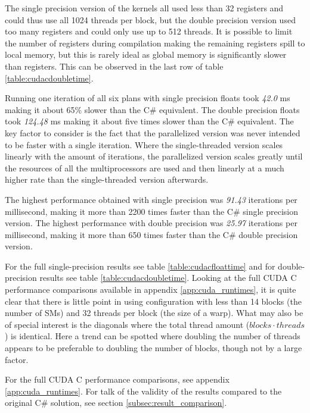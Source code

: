 The single precision version of the kernels all used less than 32 registers and could thus use all 1024 threads per block, but the double precision version used too many registers and could only use up to 512 threads. 
It is possible to limit the number of registers during compilation making the remaining registers spill to local memory, but this is rarely ideal as global memory is significantly slower than registers.
This can be observed in the last row of table \ref{table:cudacdoubletime}.

Running one iteration of all six plans with single precision floats took \emph{42.0} ms making it about 65\% slower than the C\# equivalent.
The double precision floats took \emph{124.48} ms making it about five times slower than the C\# equivalent.
The key factor to consider is the fact that the parallelized version was never intended to be faster with a single iteration.
Where the single-threaded version scales linearly with the amount of iterations, the parallelized version scales greatly until the resources of all the multiprocessors are used and then linearly at a much higher rate than the single-threaded version afterwards.

The highest performance obtained with single precision was \emph{91.43} iterations per millisecond, making it more than 2200 times faster than the C\# single precision version.
The highest performance with double precision was \emph{25.97} iterations per millisecond, making it more than 650 times faster than the C\# double precision version.

For the full single-precision results see table \ref{table:cudacfloattime} and for double-precision results see table \ref{table:cudacdoubletime}.
Looking at the full CUDA C performance comparisons available in appendix \ref{app:cuda_runtimes}, it is quite clear that there is little point in using configuration with less than 14 blocks (the number of SMs) and 32 threads per block (the size of a warp).
What may also be of special interest is the diagonals where the total thread amount ($blocks \cdot threads$) is identical.
Here a trend can be spotted where doubling the number of threads appears to be preferable to doubling the number of blocks, though not by a large factor.

For the full CUDA C performance comparisons, see appendix \ref{app:cuda_runtimes}.
For talk of the validity of the results compared to the original C\# solution, see section \ref{subsec:result_comparison}.

